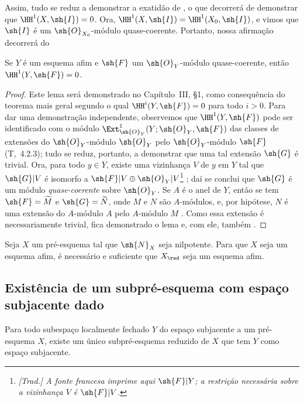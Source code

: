 \documentclass[oneside]{amsart}
\newcommand{\oldpage}[2][]{{\marginnote{\normalfont\textbf{#1}~|~#2}}\ignorespaces}
\let\EGAOriginalLabel\label
\renewcommand{\label}[1]{\phantomsection\EGAOriginalLabel{#1}}
\begin{document}
Assim, tudo se reduz a demonstrar a exatidão de , o que decorrerá de demonstrar que $\HH^1(X,\sh{I})=0$.
\oldpage[I]{131}
Ora, $\HH^1(X,\sh{I})=\HH^1(X_0,\sh{I})$, e vimos que $\sh{I}$ é um $\sh{O}_{X_0}$-módulo quase-coerente.
Portanto, nossa afirmação decorrerá do
\begin{lemma}[5.1.9.2]
\label{I.5.1.9.2}
Se $Y$ é um esquema afim e $\sh{F}$ um $\sh{O}_Y$-módulo quase-coerente, então $\HH^1(Y,\sh{F})=0$.
\end{lemma}

\begin{proof}
Este lema será demonstrado no Capítulo~III, §1, como consequência do teorema mais geral segundo o qual $\HH^i(Y,\sh{F})=0$ para todo $i>0$.
Para dar uma demonstração independente, observemos que $\HH^1(Y,\sh{F})$ pode ser identificado com o módulo $\Ext_{\sh{O}_Y}^1(Y;\sh{O}_Y,\sh{F})$ das classes de extensões do $\sh{O}_Y$-módulo $\sh{O}_Y$ pelo $\sh{O}_Y$-módulo $\sh{F}$ (T,~4.2.3);
tudo se reduz, portanto, a demonstrar que uma tal extensão $\sh{G}$ é trivial.
Ora, para todo $y\in Y$, existe uma vizinhança $V$ de $y$ em $Y$ tal que $\sh{G}|V$ é isomorfo a $\sh{F}|V\oplus\sh{O}_Y|V$\footnote{\emph{[Trad.] A fonte francesa imprime aqui $\sh{F}|Y$; a restrição necessária sobre a vizinhança $V$ é $\sh{F}|V$.}} ;
daí se conclui que $\sh{G}$ é um módulo \emph{quase-coerente} sobre $\sh{O}_Y$.
Se $A$ é o anel de $Y$, então se tem $\sh{F}=\widetilde{M}$ e $\sh{G}=\widetilde{N}$, onde $M$ e $N$ são $A$-módulos, e, por hipótese, $N$ é uma extensão do $A$-módulo $A$ pelo $A$-módulo $M$ .
Como essa extensão é necessariamente trivial, fica demonstrado o lema e, com ele, também .
\end{proof}

\begin{corollary}[5.1.10]
\label{I.5.1.10}
Seja $X$ um pré-esquema tal que $\sh{N}_X$ seja nilpotente.
Para que $X$ seja um esquema afim, é necessário e suficiente que $X_\red$ seja um esquema afim.
\end{corollary}

\subsection{Existência de um subpré-esquema com espaço subjacente dado}
\label{subsection:I.5.2}

\begin{proposition}[5.2.1]
\label{I.5.2.1}
Para todo subespaço localmente fechado $Y$ do espaço subjacente a um pré-esquema $X$, existe um único subpré-esquema reduzido de $X$ que tem $Y$ como espaço subjacente.
\end{proposition}
\end{document}
